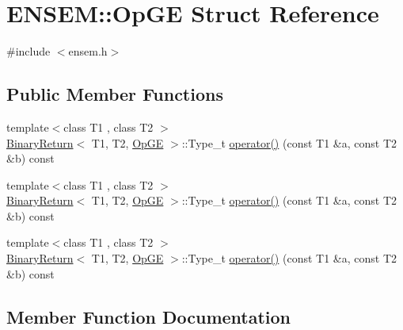 \hypertarget{structENSEM_1_1OpGE}{}\section{E\+N\+S\+EM\+:\+:Op\+GE Struct Reference}
\label{structENSEM_1_1OpGE}


{\ttfamily \#include $<$ensem.\+h$>$}

\subsection*{Public Member Functions}
\begin{DoxyCompactItemize}
\item 
{\footnotesize template$<$class T1 , class T2 $>$ }\\\mbox{\hyperlink{structENSEM_1_1BinaryReturn}{Binary\+Return}}$<$ T1, T2, \mbox{\hyperlink{structENSEM_1_1OpGE}{Op\+GE}} $>$\+::Type\+\_\+t \mbox{\hyperlink{structENSEM_1_1OpGE_ab43afee7152159c15cf9af4203049d4b}{operator()}} (const T1 \&a, const T2 \&b) const
\item 
{\footnotesize template$<$class T1 , class T2 $>$ }\\\mbox{\hyperlink{structENSEM_1_1BinaryReturn}{Binary\+Return}}$<$ T1, T2, \mbox{\hyperlink{structENSEM_1_1OpGE}{Op\+GE}} $>$\+::Type\+\_\+t \mbox{\hyperlink{structENSEM_1_1OpGE_ab43afee7152159c15cf9af4203049d4b}{operator()}} (const T1 \&a, const T2 \&b) const
\item 
{\footnotesize template$<$class T1 , class T2 $>$ }\\\mbox{\hyperlink{structENSEM_1_1BinaryReturn}{Binary\+Return}}$<$ T1, T2, \mbox{\hyperlink{structENSEM_1_1OpGE}{Op\+GE}} $>$\+::Type\+\_\+t \mbox{\hyperlink{structENSEM_1_1OpGE_ab43afee7152159c15cf9af4203049d4b}{operator()}} (const T1 \&a, const T2 \&b) const
\end{DoxyCompactItemize}


\subsection{Member Function Documentation}
\mbox{\label{structENSEM_1_1OpGE_ab43afee7152159c15cf9af4203049d4b}} 
